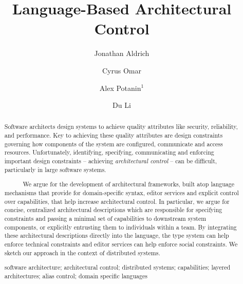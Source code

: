 \documentclass[runningheads]{llncs}
\newcommand{\keywords}[1]{\par\addvspace\baselineskip
\noindent\keywordname\enspace\ignorespaces#1}
\begin{document}
\title{Language-Based Architectural Control}
\author{Jonathan Aldrich \and Cyrus Omar \and Alex Potanin$^{1}$ \and Du Li}
\setlength{\abovecaptionskip}{0pt}
\setlength{\belowcaptionskip}{0pt}

\maketitle

\begin{sloppypar}
\begin{abstract}
Software architects design systems to achieve quality attributes like security, reliability, and performance. Key to achieving these quality attributes are design constraints governing how components of the system  are configured, communicate and access resources. Unfortunately, identifying, specifying, communicating and enforcing important design  constraints -- achieving \emph{architectural control} -- can be difficult, particularly in large software systems.

~~~~~~We argue for the development of architectural frameworks, built atop language mechanisms that provide for  domain-specific syntax, editor services and explicit control over capabilities, that help increase architectural control. In particular, we argue for concise, centralized architectural descriptions which are responsible for specifying constraints and passing a minimal set of capabilities to downstream system components, or explicitly entrusting them to individuals within a team. By integrating these architectural descriptions directly into the language, the type system can help enforce technical constraints and editor services can help enforce social constraints. We sketch our approach in the context of distributed systems.

\keywords{software architecture;
architectural control;
distributed systems;
capabilities;
layered architectures;
alias control;
domain specific languages}

\end{abstract}


\end{sloppypar}
\end{document}
